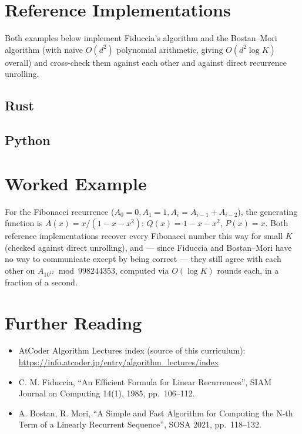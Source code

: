 \documentclass[11pt]{article}
\begin{document}
\section{Reference Implementations}
Both examples below implement Fiduccia's algorithm and the Bostan--Mori
algorithm (with naive $O(d^2)$ polynomial arithmetic, giving
$O(d^2\log K)$ overall) and cross-check them against each other and
against direct recurrence unrolling.

\codenote
\subsection{Rust}

\subsection{Python}

\section{Worked Example}
\begin{examplebox}
For the Fibonacci recurrence ($A_0=0, A_1=1, A_i=A_{i-1}+A_{i-2}$), the
generating function is $A(x) = x/(1-x-x^2)$: $Q(x)=1-x-x^2$,
$P(x)=x$. Both reference implementations recover every Fibonacci number
this way for small $K$ (checked against direct unrolling), and --- since
Fiduccia and Bostan--Mori have no way to communicate except by being
correct --- they still agree with each other on $A_{10^{12}} \bmod
998244353$, computed via $O(\log K)$ rounds each, in a fraction of a
second.
\end{examplebox}

\section{Further Reading}
\begin{itemize}[leftmargin=1.5em]
  \item AtCoder Algorithm Lectures index (source of this curriculum):
        \url{https://info.atcoder.jp/entry/algorithm_lectures/index}
  \item C. M. Fiduccia, ``An Efficient Formula for Linear Recurrences'',
        SIAM Journal on Computing 14(1), 1985, pp.\ 106--112.
  \item A. Bostan, R. Mori, ``A Simple and Fast Algorithm for Computing
        the N-th Term of a Linearly Recurrent Sequence'', SOSA 2021,
        pp.\ 118--132.
\end{itemize}
\end{document}
